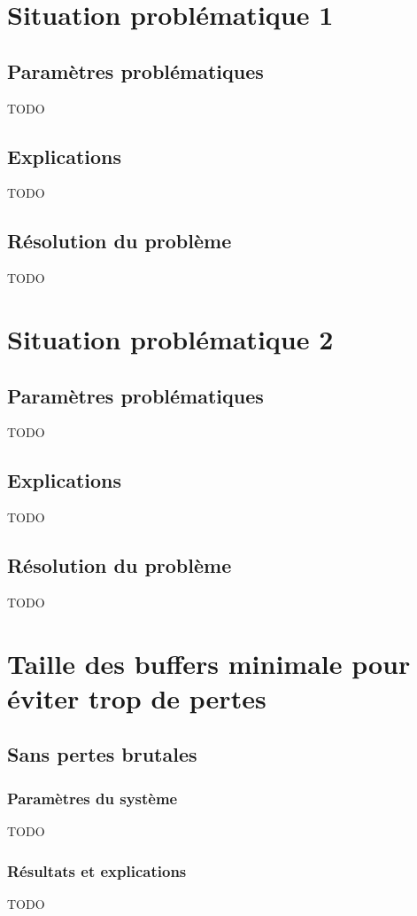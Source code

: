 \documentclass[a4paper,11pt]{article}
\begin{document}
\section{Situation problématique 1}
\subsection{Paramètres problématiques}
TODO

\subsection{Explications}
TODO

\subsection{Résolution du problème}
TODO




\section{Situation problématique 2}
\subsection{Paramètres problématiques}
TODO

\subsection{Explications}
TODO

\subsection{Résolution du problème}
TODO





\section{Taille des buffers minimale pour éviter trop de pertes}
\subsection{Sans pertes brutales}
\subsubsection{Paramètres du système}
TODO
\subsubsection{Résultats et explications}
TODO
\end{document}
